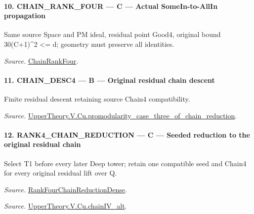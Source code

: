 \documentclass[11pt,a4paper]{article}
\numberwithin{equation}{section}
\theoremstyle{remark}\newtheorem{remark}[theorem]{Remark}
\begin{document}
\paragraph{10. CHAIN\_\allowbreak RANK\_\allowbreak FOUR — C — Actual SomeIn-to-AllIn propagation}

Same source Space and PM ideal, residual point Good4, original bound 30(C+1)\textasciicircum{}2 <= d; geometry must preserve all identities.

\emph{Source.} \href{https://github.com/CocoSgt/riemann-hypothesis-lean/blob/7cbf7a0c32fca1badf05931879a37c3f8a2b03b4/src/Development/AutomorphicArithmetic/AutomorphicVarieties/ModularityArgument/ThresholdArguments/DenseThresholdCases/PromodularityCaseThree.lean#L26-L32}{ChainRankFour}.



\paragraph{11. CHAIN\_\allowbreak DESC4 — B — Original residual chain descent}

Finite residual descent retaining source Chain4 compatibility.

\emph{Source.} \href{https://github.com/CocoSgt/riemann-hypothesis-lean/blob/7cbf7a0c32fca1badf05931879a37c3f8a2b03b4/src/Development/AutomorphicArithmetic/AutomorphicVarieties/ModularityArgument/ThresholdArguments/DenseThresholdCases/PromodularityCaseThreeOfLemmas.lean#L131-L153}{UpperTheory.V.Cu.promodularity\_\allowbreak case\_\allowbreak three\_\allowbreak of\_\allowbreak chain\_\allowbreak reduction}.



\paragraph{12. RANK4\_\allowbreak CHAIN\_\allowbreak REDUCTION — C — Seeded reduction to the original residual chain}

Select T1 before every later Deep tower; retain one compatible seed and Chain4 for every original residual lift over Q.

\emph{Source.} \href{https://github.com/CocoSgt/riemann-hypothesis-lean/blob/7cbf7a0c32fca1badf05931879a37c3f8a2b03b4/src/Development/AutomorphicArithmetic/AutomorphicVarieties/ModularityArgument/ThresholdArguments/DenseThresholdCases/PromodularityCaseThree.lean#L33-L39}{RankFourChainReductionDense}.

\emph{Source.} \href{https://github.com/CocoSgt/riemann-hypothesis-lean/blob/7cbf7a0c32fca1badf05931879a37c3f8a2b03b4/src/Development/AutomorphicArithmetic/AutomorphicVarieties/ModularityArgument/ThresholdArguments/DenseThresholdCases/CuPChainIV.lean#L16-L82}{UpperTheory.V.Cu.chainIV\_\allowbreak alt}.
\end{document}
